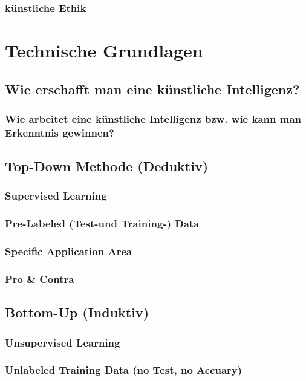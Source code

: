\documentclass[12pt,german,ngerman]{report}
\begin{document}
        \subsection{künstliche Ethik}

\chapter{Technische Grundlagen}
    \section{Wie erschafft man eine künstliche Intelligenz?}
        \subsection{Wie arbeitet eine künstliche Intelligenz bzw. wie kann man Erkenntnis gewinnen?}

    \section{Top-Down Methode (Deduktiv)}
        \subsection{Supervised Learning}
        \subsection{Pre-Labeled (Test-und Training-) Data}
        \subsection{Specific Application Area}
        \subsection{Pro \& Contra}
        
    \section{Bottom-Up (Induktiv)}
        \subsection{Unsupervised Learning}
        \subsection{Unlabeled Training Data (no Test, no Accuary)}
\end{document}
